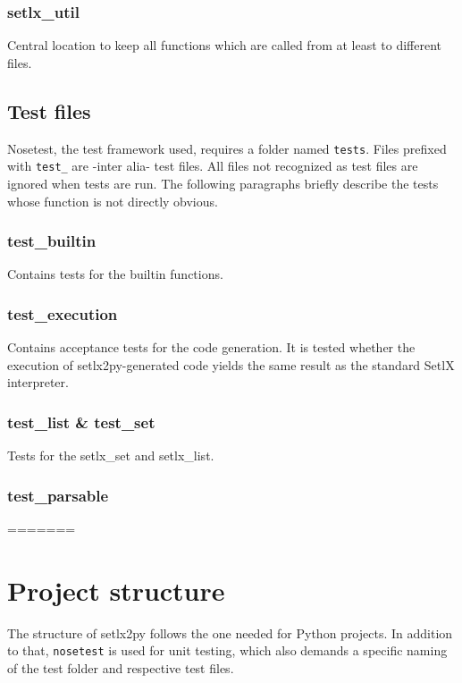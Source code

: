 %
\subsubsection{setlx\_util}

Central location to keep all functions which are called from at least to different files.

%
%
\clearpage
\subsection{Test files}

Nosetest, the test framework used, requires a folder named \texttt{tests}. Files prefixed with \texttt{test\_} are -inter alia- test files. All files not recognized as test files are ignored when tests are run. The following paragraphs briefly describe the tests whose function is not directly obvious.

%
\subsubsection{test\_builtin}

Contains tests for the builtin functions.

%
\subsubsection{test\_execution}

Contains acceptance tests for the code generation. It is tested whether the execution of setlx2py-generated code yields the same result as the standard SetlX interpreter.
%
\subsubsection{test\_list \& test\_set}

Tests for the setlx\_set and setlx_list.

%
\subsubsection{test\_parsable}

=======

\section{Project structure}

The structure of setlx2py follows the one needed for Python projects. In addition to that, \texttt{nosetest} is used for unit testing, which also demands a specific naming of the test folder and respective test files.

